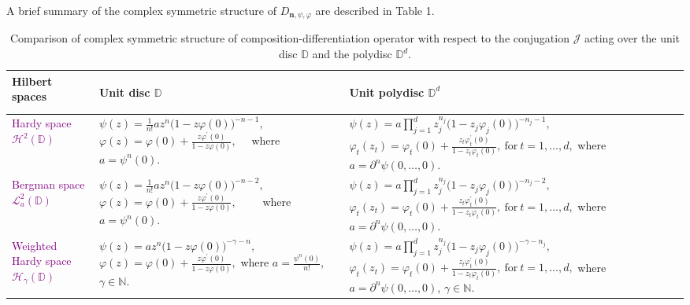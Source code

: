 \documentclass[12pt, reqno]{amsart}
\theoremstyle{definition}
\theoremstyle{remark}
\numberwithin{equation}{section}
\newcommand{\mfn}{\mathbf n}
\begin{document}
\newpage
A brief summary of the complex symmetric structure of $D_{\mfn,\psi,\varphi}$ are described in {Table} 1.
\begin{table}[h]
    \centering
    \begin{tabular}{ |p{1.60cm}|p{6.00cm}|p{7.500cm}|}          
        \hline
        \textbf{Hilbert spaces} & \begin{center}
            \textbf{Unit disc} \( \mathbb{D} \)
        \end{center}   & \begin{center}
            \textbf{Unit polydisc} \( \mathbb{D}^d \)
        \end{center} \\
        \hline        
        \textcolor{purple}{Hardy space $\mathcal{H}^2(\mathbb{D})$} &$\psi(z)=\frac{1}{n!}az^{n}\big(1-z\varphi(0)\big)^{-n-1},$       $\varphi(z)=\varphi(0)+\frac{z\varphi^{\prime}(0)}{1-z\varphi(0)},$~~ 
where $a=\psi^n(0)$.   & $\psi(z)=a\prod_{j=1}^dz_j^{n_j}\big(1-z_j\varphi_j(0)\big)^{-n_j-1},$       $\varphi_t(z_t)=\varphi_t(0)+\frac{z_t\varphi_t^{\prime}(0)}{1-z_t\varphi_t(0)},~ \mbox{for}~ t=1, \dots, d,$ 
where $a=\partial^n\psi(0, \dots, 0)$.  \\
         \hline
        \textcolor{purple}{Bergman space $\mathcal{L}_a^2(\mathbb{D})$} &$\psi(z)=\frac{1}{n!}az^{n}\big(1-z\varphi(0)\big)^{-n-2},$       $\varphi(z)=\varphi(0)+\frac{z\varphi^{\prime}(0)}{1-z\varphi(0)},$~~~~  where $a=\psi^n(0)$.  &$\psi(z)=a\prod_{j=1}^dz_j^{n_j}\big(1-z_j\varphi_j(0)\big)^{-n_j-2},$       $\varphi_t(z_t)=\varphi_t(0)+\frac{z_t\varphi_t^{\prime}(0)}{1-z_t\varphi_t(0)},~ \mbox{for}~ t=1, \dots, d,$ 
where $a=\partial^n\psi(0, \dots, 0)$.
\\
         \hline
        \textcolor{purple}{Weighted Hardy space $\mathcal{H}_\gamma(\mathbb{D})$} &$ \psi(z)=az^{n}\big(1-z\varphi(0)\big)^{-\gamma-n},$ 
        $\varphi(z)=\varphi(0)+\frac{z\varphi^{\prime}(0)}{1-z\varphi(0)},$ 
        where $a=\frac{\psi^n(0)}{n!}$, $\gamma\in \mathbb{N}$.   & $ \psi(z)=a\prod_{j=1}^dz_j^{n_j}\big(1-z_j\varphi_j(0)\big)^{-\gamma-n_j},$ 
        $\varphi_t(z_t)=\varphi_t(0)+\frac{z_t\varphi_t^{\prime}(0)}{1-z_t\varphi_t(0)},~ \mbox{for}~ t=1, \dots, d,$ 
        where $a=\partial^n\psi(0, \dots, 0)$, $\gamma\in \mathbb{N}$.
 \\
        \hline
    \end{tabular}
    \caption{Comparison of complex symmetric structure of composition-differentiation operator with respect to
the conjugation $\mathcal{J}$ acting over the unit disc $\mathbb{D}$ and the polydisc $\mathbb{D}^d$.}
\end{table}
\end{document}
